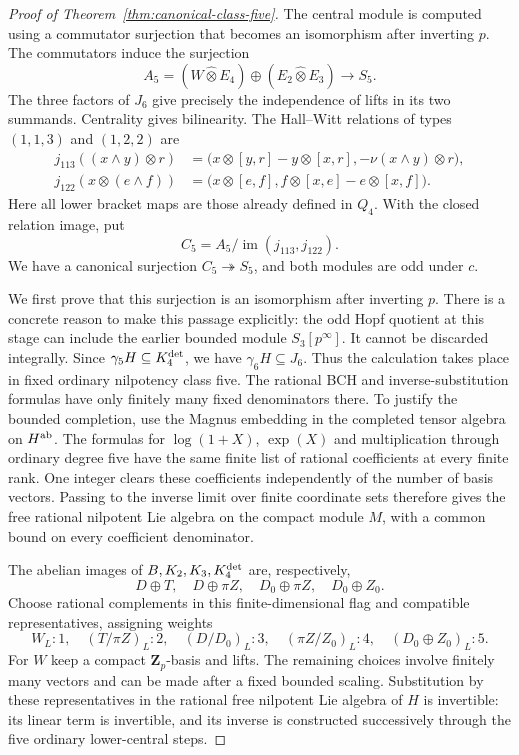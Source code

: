 \begin{proof}[Proof of Theorem~\ref{thm:canonical-class-five}]
The central module is computed using a commutator
surjection that becomes an isomorphism after inverting $p$.
The commutators induce the surjection
\[
 A_5=(W\widehat\otimes E_4)\oplus
                              (E_2\widehat\otimes E_3)
                         \longrightarrow S_5.
\]
The three factors of $J_6$ give precisely the
independence of lifts in its two summands.
Centrality gives bilinearity. The Hall--Witt relations
of types $(1,1,3)$ and $(1,2,2)$ are
\begin{align*}
 j_{113}((x\wedge y)\otimes r)
   &=\bigl(x\otimes[y,r]-y\otimes[x,r],
                                  -\nu(x\wedge y)\otimes r\bigr),\\
 j_{122}(x\otimes(e\wedge f))
   &=\bigl(x\otimes[e,f],
                                  f\otimes[x,e]-e\otimes[x,f]\bigr).
\end{align*}
Here all lower bracket maps are those already defined
in $Q_4$. With the closed relation image, put
\begin{equation}\label{eq:class5-candidate}
 C_5=A_5/\operatorname{im}(j_{113},j_{122}).
\end{equation}
We have a canonical surjection $C_5\twoheadrightarrow S_5$,
and both modules are odd under $c$.

We first prove that this surjection is an isomorphism
after inverting $p$. There is a concrete reason to
make this passage explicitly: the odd Hopf quotient
at this stage can include the earlier bounded module
$S_3[p^\infty]$. It cannot be discarded integrally.
Since $\gamma_5H\subseteq K_4^{\rm det}$, we have
$\gamma_6H\subseteq J_6$. Thus the calculation takes
place in fixed ordinary nilpotency class five.
The rational BCH and inverse-substitution formulas
have only finitely many fixed denominators there.
To justify the bounded completion, use the Magnus
embedding in the completed tensor algebra on
$H^{\rm ab}$. The formulas for $\log(1+X)$, $\exp(X)$
and multiplication through ordinary degree five have
the same finite list of rational coefficients at
every finite rank. One integer clears these
coefficients independently of the number of basis
vectors. Passing to the inverse limit over finite
coordinate sets therefore gives the free rational
nilpotent Lie algebra on the compact module $M$,
with a common bound on every coefficient denominator.

The abelian images of $B,K_2,K_3,K_4^{\rm det}$
are, respectively,
\[
 D\oplus T,\quad D\oplus\pi Z,\quad
 D_0\oplus\pi Z,\quad D_0\oplus Z_0.
\]
Choose rational complements in this finite-dimensional
flag and compatible representatives, assigning weights
\[
 W_L:1,\quad (T/\pi Z)_L:2,\quad (D/D_0)_L:3,
 \quad(\pi Z/Z_0)_L:4,\quad(D_0\oplus Z_0)_L:5.
\]
For $W$ keep a compact $\mathbf Z_p$-basis and lifts.
The remaining choices involve finitely many vectors
and can be made after a fixed bounded scaling.
Substitution by these representatives in the rational
free nilpotent Lie algebra of $H$ is invertible:
its linear term is invertible, and its inverse is
constructed successively through the five ordinary
lower-central steps.


\end{proof}
